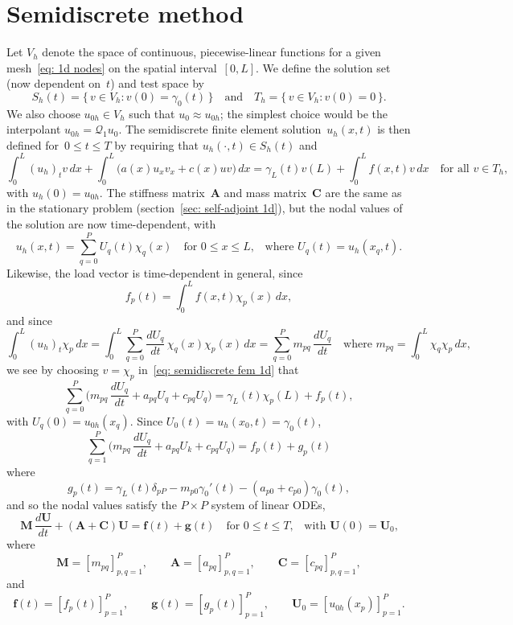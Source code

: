 \section{Semidiscrete method}
Let $V_h$ denote the space of continuous, piecewise-linear functions for a 
given mesh~\eqref{eq: 1d nodes} on the spatial interval~$[0,L]$.  We define the 
solution set (now dependent on~$t$) and test space by
\[
S_h(t)=\{\,v\in V_h:v(0)=\gamma_0(t)\,\}
\quad\text{and}\quad
T_h=\{\,v\in V_h:v(0)=0\,\}.
\]
We also choose $u_{0h}\in V_h$ such that $u_0\approx u_{0h}$; the simplest 
choice would be the interpolant $u_{0h}=\mathcal{Q}_1u_0$. The semidiscrete
finite element solution~$u_h(x,t)$ is then defined for~$0\le t\le T$ by 
requiring that $u_h(\cdot,t)\in S_h(t)$ and
\begin{equation}\label{eq: semidiscrete fem 1d}
\int_0^L(u_h)_tv\,dx+\int_0^L\bigl(a(x)u_xv_x+c(x)uv\bigr)\,dx
    =\gamma_L(t)v(L)+\int_0^Lf(x,t)v\,dx
\quad\text{for all $v\in T_h$,}
\end{equation}
with $u_h(0)=u_{0h}$. The stiffness matrix~$\boldsymbol{A}$ and mass 
matrix~$\boldsymbol{C}$ are the same as in the stationary problem 
(section~\ref{sec: self-adjoint 1d}), but the nodal 
values of the solution are now time-dependent, with
\[
u_h(x,t)=\sum_{q=0}^P U_q(t)\chi_q(x)\quad\text{for $0\le x\le L$,}\quad
\text{where $U_q(t)=u_h(x_q,t)$.}
\]
Likewise, the load vector is time-dependent in general, since
\[
f_p(t)=\int_0^Lf(x,t)\chi_p(x)\,dx,
\]
and since
\[
\int_0^L(u_h)_t\chi_p\,dx=\int_0^L\sum_{q=0}^P
    \frac{dU_q}{dt}\,\chi_q(x)\chi_p(x)\,dx=\sum_{q=0}^P m_{pq}\,\frac{dU_q}{dt}
    \quad\text{where $m_{pq}=\int_0^L\chi_q\chi_p\,dx$,}
\]
we see by choosing $v=\chi_p$ in~\eqref{eq: semidiscrete fem 1d} that
\[
\sum_{q=0}^P\biggl(m_{pq}\,\frac{dU_q}{dt}+a_{pq}U_q+c_{pq}U_q\biggr)
    =\gamma_L(t)\chi_p(L)+f_p(t),
\]
with $U_q(0)=u_{0h}(x_q)$.  Since $U_0(t)=u_h(x_0,t)=\gamma_0(t)$,
\[
\sum_{q=1}^P\biggl(m_{pq}\,\frac{dU_q}{dt}+a_{pq}U_k+c_{pq}U_q\biggr)
    =f_p(t)+g_p(t)
\]
where
\[
g_p(t)=\gamma_L(t)\delta_{pP}-m_{p0}\gamma_0'(t)-(a_{p0}+c_{p0})\gamma_0(t),
\]
and so the nodal values satisfy the $P\times P$ system of linear ODEs,
\begin{equation}\label{eq: semidiscrete fem 1d ODE}
\boldsymbol{M}\,\frac{d\boldsymbol{U}}{dt}
+(\boldsymbol{A}+\boldsymbol{C})\boldsymbol{U}=\boldsymbol{f}(t)
    +\boldsymbol{g}(t)\quad\text{for $0\le t\le T$,}
    \quad\text{with $\boldsymbol{U}(0)=\boldsymbol{U}_0$,}
\end{equation}
where 
\[
\boldsymbol{M}=[m_{pq}]_{p,q=1}^P,\qquad 
\boldsymbol{A}=[a_{pq}]_{p,q=1}^P,\qquad
\boldsymbol{C}=[c_{pq}]_{p,q=1}^P,
\]
and
\[
\boldsymbol{f}(t)=[f_p(t)]_{p=1}^P,\qquad
\boldsymbol{g}(t)=[g_p(t)]_{p=1}^P,\qquad
\boldsymbol{U}_0=[u_{0h}(x_p)]_{p=1}^P.
\]


